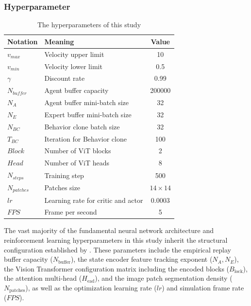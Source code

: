     \subsubsection{Hyperparameter}
    \begin{table}[htbp]
    \centering
    \caption{The hyperparameters of this study}
    \label{tab:hyperparameter}
    \begin{tabular}{llc}
    \toprule
    \textbf{Notation} & \textbf{Meaning} & \textbf{Value} \\ \midrule
    $v_{max}$ & Velocity upper limit & 10 \\
    $v_{min}$ & Velocity lower limit & 0.5 \\
    $\gamma$ & Discount rate & 0.99 \\
    $N_{buffer}$ & Agent buffer capacity & 200000 \\
    $N_{A}$ & Agent buffer mini-batch size & 32 \\ 
    $N_{E}$ & Expert buffer mini-batch size & 32 \\ 
    $N_{BC}$ & Behavior clone batch size & 32 \\ 
    $T_{BC}$ & Iteration for Behavior clone & 100 \\ 
    $Block$ & Number of ViT blocks & 2 \\ 
    $Head$ & Number of ViT heads & 8 \\ 
    $N_{steps}$ & Training step & 500 \\ 
    $N_{patches}$ & Patches size & $14\times14$ \\ 
    $lr$ & Learning rate for critic and actor & 0.0003 \\ 
    $FPS$ & Frame per second & 5 \\ 
    \bottomrule
    \end{tabular}
    \end{table}

    The vast majority of the fundamental neural network architecture and reinforcement learning hyperparameters in this study inherit the structural configuration established by \cite{elallid_improving_2024}. These parameters include the empirical replay buffer capacity ($N_{\text{buffer}}$), the state encoder feature tracking exponent ($N_A, N_E$), the Vision Transformer configuration matrix including the encoded blocks ($B_{\text{lock}}$), the attention multi-head ($H_{\text{ead}}$), and the image patch segmentation density ($N_{\text{patches}}$), as well as the optimization learning rate ($lr$) and simulation frame rate ($FPS$).

